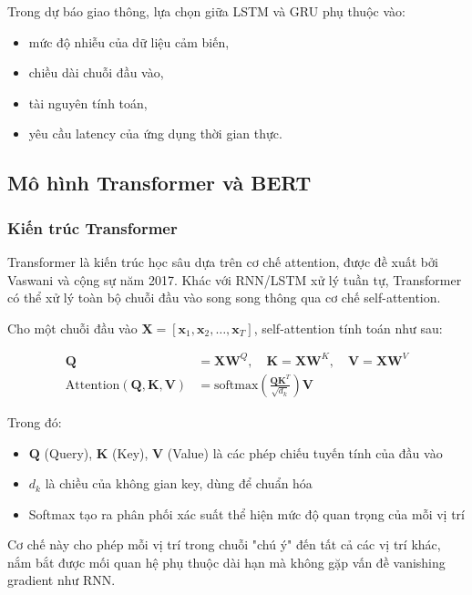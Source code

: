Trong dự báo giao thông, lựa chọn giữa LSTM và GRU phụ thuộc vào:
\begin{itemize}
    \item mức độ nhiễu của dữ liệu cảm biến,
    \item chiều dài chuỗi đầu vào,
    \item tài nguyên tính toán,
    \item yêu cầu latency của ứng dụng thời gian thực.
\end{itemize}

\newpage

\subsection{Mô hình Transformer và BERT}

\subsubsection{Kiến trúc Transformer}


Transformer là kiến trúc học sâu dựa trên cơ chế attention, được đề xuất bởi Vaswani và cộng sự năm 2017. Khác với RNN/LSTM xử lý tuần tự, Transformer có thể xử lý toàn bộ chuỗi đầu vào song song thông qua cơ chế self-attention.

Cho một chuỗi đầu vào $\mathbf{X} = [\mathbf{x}_1, \mathbf{x}_2, \dots, \mathbf{x}_T]$, self-attention tính toán như sau:

\begin{align}
\mathbf{Q} &= \mathbf{X}\mathbf{W}^Q, \quad \mathbf{K} = \mathbf{X}\mathbf{W}^K, \quad \mathbf{V} = \mathbf{X}\mathbf{W}^V \\
\text{Attention}(\mathbf{Q}, \mathbf{K}, \mathbf{V}) &= \text{softmax}\left(\frac{\mathbf{Q}\mathbf{K}^T}{\sqrt{d_k}}\right)\mathbf{V}
\end{align}

Trong đó:
\begin{itemize}
    \item $\mathbf{Q}$ (Query), $\mathbf{K}$ (Key), $\mathbf{V}$ (Value) là các phép chiếu tuyến tính của đầu vào
    \item $d_k$ là chiều của không gian key, dùng để chuẩn hóa
    \item Softmax tạo ra phân phối xác suất thể hiện mức độ quan trọng của mỗi vị trí
\end{itemize}

Cơ chế này cho phép mỗi vị trí trong chuỗi "chú ý" đến tất cả các vị trí khác, nắm bắt được mối quan hệ phụ thuộc dài hạn mà không gặp vấn đề vanishing gradient như RNN.


